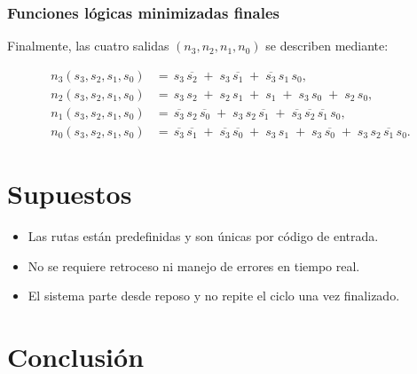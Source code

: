 \documentclass[12pt]{article}
\begin{document}
\subsubsection*{Funciones lógicas minimizadas finales}

Finalmente, las cuatro salidas \((n_{3},n_{2},n_{1},n_{0})\) se describen mediante:

\[
\begin{aligned}
  n_{3}(s_{3},s_{2},s_{1},s_{0})
  &=\, s_{3}\,\overline{s_{2}}
    \;+\; s_{3}\,\overline{s_{1}}
    \;+\; \overline{s_{3}}\,s_{1}\,s_{0},\\[6pt]
  n_{2}(s_{3},s_{2},s_{1},s_{0})
  &=\, s_{3}\,s_{2}
    \;+\; s_{2}\,s_{1}
    \;+\; s_{1}
    \;+\; s_{3}\,s_{0}
    \;+\; s_{2}\,s_{0},\\[6pt]
  n_{1}(s_{3},s_{2},s_{1},s_{0})
  &=\, \overline{s_{3}}\,s_{2}\,\overline{s_{0}}
    \;+\; s_{3}\,s_{2}\,\overline{s_{1}}
    \;+\; \overline{s_{3}}\,\overline{s_{2}}\,\overline{s_{1}}\,s_{0},\\[6pt]
  n_{0}(s_{3},s_{2},s_{1},s_{0})
  &=\, \overline{s_{3}}\,\overline{s_{1}}
    \;+\; \overline{s_{3}}\,\overline{s_{0}}
    \;+\; s_{3}\,s_{1}
    \;+\; s_{3}\,\overline{s_{0}}
    \;+\; s_{3}\,s_{2}\,\overline{s_{1}}\,s_{0}.
\end{aligned}
\]


\section{Supuestos}
\begin{itemize}
    \item Las rutas están predefinidas y son únicas por código de entrada.
    \item No se requiere retroceso ni manejo de errores en tiempo real.
    \item El sistema parte desde reposo y no repite el ciclo una vez finalizado.
\end{itemize}

\section{Conclusión}
\end{document}
